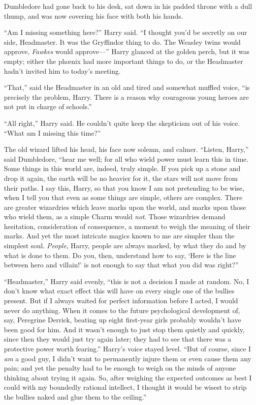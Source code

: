 Dumbledore had gone back to his desk, sat down in his padded throne with a dull thump, and was now covering his face with both his hands.

“Am I missing something here?” Harry said. “I thought you’d be secretly on our side, Headmaster. It was the Gryffindor thing to do. The Weasley twins would approve, \emph{Fawkes} would approve—” Harry glanced at the golden perch, but it was empty; either the phœnix had more important things to do, or the Headmaster hadn’t invited him to today’s meeting.

“That,” said the Headmaster in an old and tired and somewhat muffled voice, “is precisely the problem, Harry. There is a reason why courageous young heroes are not put in charge of schools.”

“All right,” Harry said. He couldn’t quite keep the skepticism out of his voice. “What am I missing this time?”

The old wizard lifted his head, his face now solemn, and calmer. “Listen, Harry,” said Dumbledore, “hear me well; for all who wield power must learn this in time. Some things in this world are, indeed, truly simple. If you pick up a stone and drop it again, the earth will be no heavier for it, the stars will not move from their paths. I say this, Harry, so that you know I am not pretending to be wise, when I tell you that even as some things are simple, others are complex. There are greater wizardries which leave marks upon the world, and marks upon those who wield them, as a simple Charm would \emph{not}. Those wizardries demand hesitation, consideration of consequence, a moment to weigh the meaning of their marks. And yet the most intricate magics known to me are simpler than the simplest soul. \emph{People}, Harry, people are always marked, by what they do and by what is done to them. Do you, then, understand how to say, ‘Here is the line between hero and villain!’ is not enough to say that what you did was right?”

“Headmaster,” Harry said evenly, “this is not a decision I made at random. No, I don’t know what exact effect this will have on every single one of the bullies present. But if I always waited for perfect information before I acted, I would never do anything. When it comes to the future psychological development of, say, Peregrine Derrick, beating up eight first-year girls probably wouldn’t have been good for him. And it wasn’t enough to just stop them quietly and quickly, since then they would just try again later; they had to see that there was a protective power worth fearing.” Harry’s voice stayed level. “But of course, since I \emph{am} a good guy, I didn’t want to permanently injure them or even cause them any pain; and yet the penalty had to be enough to weigh on the minds of anyone thinking about trying it again. So, after weighing the expected outcomes as best I could with my boundedly rational intellect, I thought it would be wisest to strip the bullies naked and glue them to the ceiling.”

